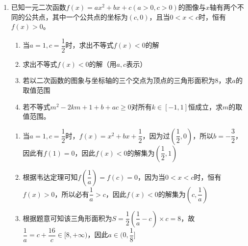 \begin{enumerate}
\begin{enumerate}
        \begin{jieda}
            $(a-c)^2 + (b-d)^2$的几何意义为$A(a, b), B(c,d)$两点间距离的平方，$A$在对勾函数$y = x + \dfrac{4}{x}$上，$B$在单位圆$x^2+y^2 = 1$上。$(a-c)^2 + (b-d)^2$为$|AB|^2$ \\
            固定点$A$时，$OAB$构成三角形$|AB| + 1 > |OB|$,仅当$B$在$OA$上时此时$|AB| = |OB| - 1$最小。 \\
            $|OA|^2 = a^2 + b^2 = a^2 + (a + \dfrac{4}{a})^2 = 2a^2 + 8 + \dfrac{16}{a^2} \geq 8 + 2\sqrt{32} = 8 + 8\sqrt{2}$（$a = \sqrt[4]{8}$时取等）\\
            此时$ab = a^2+4 = 4 + 2\sqrt{2}$，此时根据相似三角形可知$\dfrac{a}{c} = \dfrac{b}{d} = \dfrac{|OA|}{1} = \sqrt{8 + 8\sqrt{2}}$，故$\dfrac{ab}{cd} = 8 + 8\sqrt{2}$，因此$cd = \dfrac{4 + 2\sqrt{2}}{8+8\sqrt{2}}$，故$abcd = \dfrac{(4 + 2\sqrt{2})^2}{8+8\sqrt{2}} = \dfrac{24 + 16\sqrt{2}}{8+8\sqrt{2}} = \dfrac{3+2\sqrt{2}}{1+\sqrt{2}} = 1+\sqrt{2}$
        \end{jieda}
        \item 已知一元二次函数$f(x) = ax^2 + bx + c (a > 0, c > 0)$的图像与$x$轴有两个不同的公共点，其中一个公共点的坐标为$(c, 0)$，且当$0 < x < c$时，恒有$f(x) > 0$。
        \begin{enumerate}
            \item 当$a = 1, c = \dfrac{1}{2}$时，求出不等式$f(x) < 0$的解
            \item 求出不等式$f(x) < 0$的解（用$a, c$表示）
            \item 若以二次函数的图象与坐标轴的三个交点为顶点的三角形面积为8，求$a$的取值范围
            \item 若不等式$m^2-2km+1+b+ac \geq 0$对所有$k \in [-1, 1]$恒成立，求$m$的取值范围。
        \end{enumerate}
        \begin{jieda}
            \begin{enumerate}
                \item 当$a = 1, c = \dfrac{1}{2}$时，$f(x) = x^2 + bx + \dfrac{1}{2}$，因为过$(\dfrac{1}{2}, 0)$，所以$b = -\dfrac{3}{2}$，因此有$f(1) = 0$，因此$f(x) < 0$的解集为$(\dfrac{1}{2}, 1)$
                \item 根据韦达定理可知$f(\dfrac{1}{a}) = f(c) = 0$，因为当$0 < x < c$时，恒有$f(x) > 0$，所以必有$\dfrac{1}{a} > c$，因此$f(x) < 0$的解集为$(c, \dfrac{1}{a})$
                \item 根据题意可知该三角形面积为$S = \dfrac{1}{2}(\dfrac{1}{a} - c) \times c = 8$，故$\dfrac{1}{a} = c + \dfrac{16}{c} \in [8, +\infty)$，因此$a \in (0, \dfrac{1}{8}]$

\end{enumerate}
\end{jieda}
\end{enumerate}
\end{enumerate}
